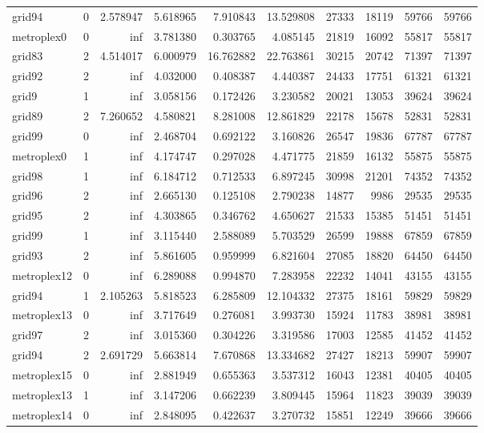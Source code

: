 \begin{longtable}{|l|r|r|r|r|r|r|r|r|r|}
grid94 & 0 & 2.578947 & 5.618965 & 7.910843 & 13.529808 & 27333 & 18119 & 59766 & 59766 \\
metroplex0 & 0 & inf & 3.781380 & 0.303765 & 4.085145 & 21819 & 16092 & 55817 & 55817 \\
grid83 & 2 & 4.514017 & 6.000979 & 16.762882 & 22.763861 & 30215 & 20742 & 71397 & 71397 \\
grid92 & 2 & inf & 4.032000 & 0.408387 & 4.440387 & 24433 & 17751 & 61321 & 61321 \\
grid9 & 1 & inf & 3.058156 & 0.172426 & 3.230582 & 20021 & 13053 & 39624 & 39624 \\
grid89 & 2 & 7.260652 & 4.580821 & 8.281008 & 12.861829 & 22178 & 15678 & 52831 & 52831 \\
grid99 & 0 & inf & 2.468704 & 0.692122 & 3.160826 & 26547 & 19836 & 67787 & 67787 \\
metroplex0 & 1 & inf & 4.174747 & 0.297028 & 4.471775 & 21859 & 16132 & 55875 & 55875 \\
grid98 & 1 & inf & 6.184712 & 0.712533 & 6.897245 & 30998 & 21201 & 74352 & 74352 \\
grid96 & 2 & inf & 2.665130 & 0.125108 & 2.790238 & 14877 & 9986 & 29535 & 29535 \\
grid95 & 2 & inf & 4.303865 & 0.346762 & 4.650627 & 21533 & 15385 & 51451 & 51451 \\
grid99 & 1 & inf & 3.115440 & 2.588089 & 5.703529 & 26599 & 19888 & 67859 & 67859 \\
grid93 & 2 & inf & 5.861605 & 0.959999 & 6.821604 & 27085 & 18820 & 64450 & 64450 \\
metroplex12 & 0 & inf & 6.289088 & 0.994870 & 7.283958 & 22232 & 14041 & 43155 & 43155 \\
grid94 & 1 & 2.105263 & 5.818523 & 6.285809 & 12.104332 & 27375 & 18161 & 59829 & 59829 \\
metroplex13 & 0 & inf & 3.717649 & 0.276081 & 3.993730 & 15924 & 11783 & 38981 & 38981 \\
grid97 & 2 & inf & 3.015360 & 0.304226 & 3.319586 & 17003 & 12585 & 41452 & 41452 \\
grid94 & 2 & 2.691729 & 5.663814 & 7.670868 & 13.334682 & 27427 & 18213 & 59907 & 59907 \\
metroplex15 & 0 & inf & 2.881949 & 0.655363 & 3.537312 & 16043 & 12381 & 40405 & 40405 \\
metroplex13 & 1 & inf & 3.147206 & 0.662239 & 3.809445 & 15964 & 11823 & 39039 & 39039 \\
metroplex14 & 0 & inf & 2.848095 & 0.422637 & 3.270732 & 15851 & 12249 & 39666 & 39666 \\

\end{longtable}
